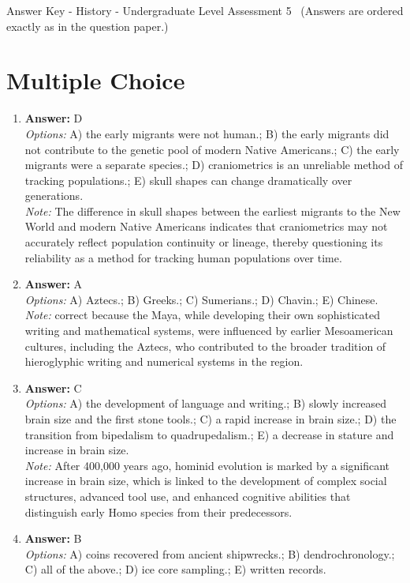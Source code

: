 \documentclass[12pt]{article}
\begin{document}
\begin{center}
Answer Key - History - Undergraduate Level Assessment 5 \
\small (Answers are ordered exactly as in the question paper.)
\end{center}

\section*{Multiple Choice}
\begin{enumerate}[label=\arabic*.]
\item \textbf{Answer:} D
\\ \textit{Options:} A) the early migrants were not human.; B) the early migrants did not contribute to the genetic pool of modern Native Americans.; C) the early migrants were a separate species.; D) craniometrics is an unreliable method of tracking populations.; E) skull shapes can change dramatically over generations.
\\ \textit{Note:} The difference in skull shapes between the earliest migrants to the New World and modern Native Americans indicates that craniometrics may not accurately reflect population continuity or lineage, thereby questioning its reliability as a method for tracking human populations over time.
\item \textbf{Answer:} A
\\ \textit{Options:} A) Aztecs.; B) Greeks.; C) Sumerians.; D) Chavin.; E) Chinese.
\\ \textit{Note:} correct because the Maya, while developing their own sophisticated writing and mathematical systems, were influenced by earlier Mesoamerican cultures, including the Aztecs, who contributed to the broader tradition of hieroglyphic writing and numerical systems in the region.
\item \textbf{Answer:} C
\\ \textit{Options:} A) the development of language and writing.; B) slowly increased brain size and the first stone tools.; C) a rapid increase in brain size.; D) the transition from bipedalism to quadrupedalism.; E) a decrease in stature and increase in brain size.
\\ \textit{Note:} After 400,000 years ago, hominid evolution is marked by a significant increase in brain size, which is linked to the development of complex social structures, advanced tool use, and enhanced cognitive abilities that distinguish early Homo species from their predecessors.
\item \textbf{Answer:} B
\\ \textit{Options:} A) coins recovered from ancient shipwrecks.; B) dendrochronology.; C) all of the above.; D) ice core sampling.; E) written records.

\end{enumerate}
\end{document}
